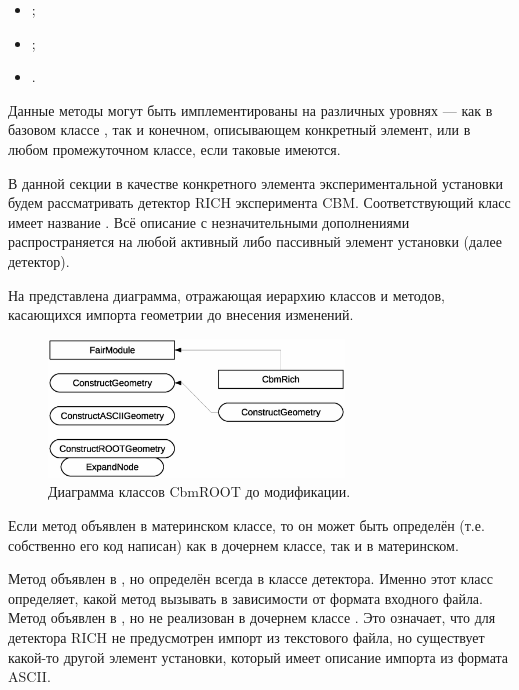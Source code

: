 \begin{itemize}
\itemsep0pt
\item {};
\item {};
\item {}.
\end{itemize}

Данные методы могут быть имплементированы на различных уровнях --- как в базовом классе , так и конечном, описывающем конкретный элемент, или в любом промежуточном классе, если таковые имеются.

В данной секции в качестве конкретного элемента экспериментальной установки будем рассматривать детектор RICH эксперимента CBM. Соответствующий класс имеет название . Всё описание с незначительными дополнениями распространяется на любой активный либо пассивный элемент установки (далее детектор).

На  представлена диаграмма, отражающая иерархию классов и методов, касающихся импорта геометрии до внесения изменений.

\begin{figure}[H]
\centering
\includegraphics[width=0.7\textwidth]{pictures/FairModule_classes_before.eps}
\caption{Диаграмма классов CbmROOT до модификации.}
\label{fig:classesBefore}
\end{figure}

Если метод объявлен в материнском классе, то он может быть определён (т.е. собственно его код написан) как в дочернем классе, так и в материнском.

Метод  объявлен в , но определён всегда в классе детектора. Именно этот класс определяет, какой метод вызывать в зависимости от формата входного файла. Метод  объявлен в , но не реализован в дочернем классе . Это означает, что для детектора RICH не предусмотрен импорт из текстового файла, но существует какой-то другой элемент установки, который имеет описание импорта из формата ASCII.

